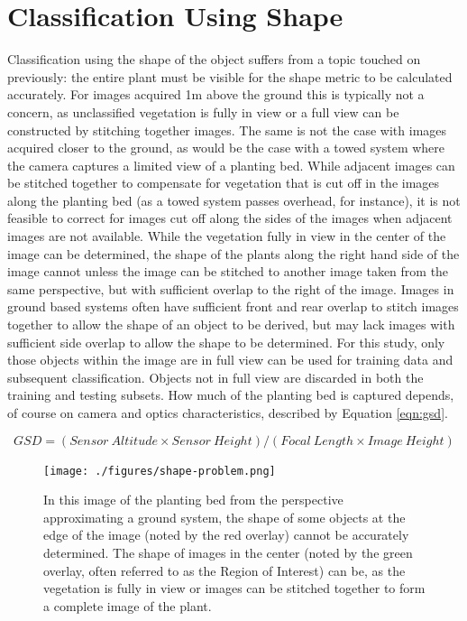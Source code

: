 \documentclass[letterpaper]{report}
\begin{document}
\section{Classification Using Shape}
Classification using the shape of the object suffers from a topic touched on previously: the entire plant must be visible for the shape metric to be calculated accurately. For images acquired 1m above the ground this is typically not a concern, as unclassified vegetation is fully in view or a full view can be constructed by stitching together images. The same is not the case with images acquired closer to the ground, as would be the case with a towed system where the camera captures a limited view of a planting bed. While adjacent images can be stitched together to compensate for vegetation that is cut off in the images along the planting bed (as a towed system passes overhead, for instance), it is not feasible to correct for images cut off along the sides of the images when adjacent images are not available. While the vegetation fully in view in the center of the image can be determined, the shape of the plants along the right hand side of the image cannot unless the image can be stitched to another image taken from the same perspective, but with sufficient overlap to the right of the image. Images in ground based systems often have sufficient front and rear overlap to stitch images together to allow the shape of an object to be derived, but may lack images with sufficient side overlap to allow the shape to be determined. For this study, only those objects within the image are in full view can be used for training data and subsequent classification. Objects not in full view are discarded in both the training and testing subsets. How much of the planting bed is captured depends, of course on camera and 
optics characteristics, described by Equation \ref{eqn:gsd}.

\begin{equation}
\label{eqn:gsd}
GSD = (Sensor\ Altitude \times Sensor\ Height) / (Focal\ Length \times Image\ Height)
\end{equation}

 \begin{figure}[H]
	\centering
	\texttt{[image: ./figures/shape-problem.png]}
	\caption[Shape of some objects cannot be determined]{In this image of the planting bed from the perspective approximating a ground system, the shape of some objects at the edge of the image (noted by the red overlay) cannot be accurately determined. The shape of images in the center (noted by the green overlay, often referred to as the Region of Interest) can be, as the vegetation is fully in view or images can be stitched together to form a complete image of the plant.}
	\label{fig:shape-problem}
\end{figure}
\end{document}
